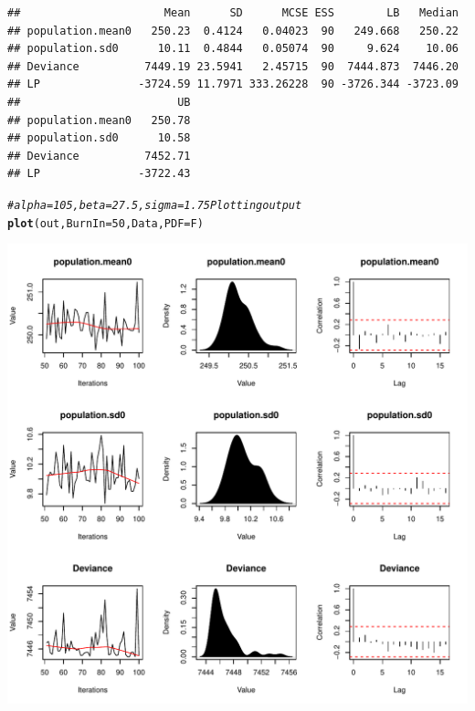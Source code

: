\documentclass{article}\usepackage[]{graphicx}\usepackage[]{color}
\makeatletter
\def\maxwidth{ %
  \ifdim\Gin@nat@width>\linewidth
    \linewidth
  \else
    \Gin@nat@width
  \fi
}
\newcommand{\hlnum}[1]{\textcolor[rgb]{0.686,0.059,0.569}{#1}}%
\newcommand{\hlcom}[1]{\textcolor[rgb]{0.678,0.584,0.686}{\textit{#1}}}%
\newcommand{\hlstd}[1]{\textcolor[rgb]{0.345,0.345,0.345}{#1}}%
\newcommand{\hlkwc}[1]{\textcolor[rgb]{0.333,0.667,0.333}{#1}}%
\newcommand{\hlkwd}[1]{\textcolor[rgb]{0.737,0.353,0.396}{\textbf{#1}}}%
\newenvironment{kframe}{%
 \def\at@end@of@kframe{}%
 \ifinner\ifhmode%
  \def\at@end@of@kframe{\end{minipage}}%
  \begin{minipage}{\columnwidth}%
 \fi\fi%
 \def\FrameCommand##1{\hskip\@totalleftmargin \hskip-\fboxsep
 \colorbox{shadecolor}{##1}\hskip-\fboxsep
     \hskip-\linewidth \hskip-\@totalleftmargin \hskip\columnwidth}%
 \MakeFramed {\advance\hsize-\width
   \@totalleftmargin\z@ \linewidth\hsize
   \@setminipage}}%
 {\par\unskip\endMakeFramed%
 \at@end@of@kframe}
\newenvironment{knitrout}{}{} %
\makeatother
\begin{document}
\begin{knitrout}
\begin{kframe}
\begin{verbatim}
##                      Mean      SD      MCSE ESS        LB   Median
## population.mean0   250.23  0.4124   0.04023  90   249.668   250.22
## population.sd0      10.11  0.4844   0.05074  90     9.624    10.06
## Deviance          7449.19 23.5941   2.45715  90  7444.873  7446.20
## LP               -3724.59 11.7971 333.26228  90 -3726.344 -3723.09
##                        UB
## population.mean0   250.78
## population.sd0      10.58
## Deviance          7452.71
## LP               -3722.43
\end{verbatim}
\begin{alltt}
\hlcom{# alpha= 105, beta= 27.5, sigma= 1.75 Plotting output}
\hlkwd{plot}\hlstd{(out,} \hlkwc{BurnIn} \hlstd{=} \hlnum{50}\hlstd{, Data,} \hlkwc{PDF} \hlstd{= F)}
\end{alltt}
\end{kframe}
\includegraphics[width=\maxwidth]{figure/unnamed-chunk-132} 


\end{knitrout}
\end{document}
